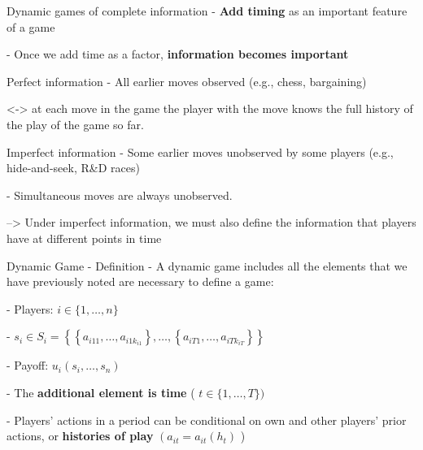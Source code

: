 \begin{titleboxchi}{Dynamic games of complete information}
    - \textbf{Add timing} as an important feature of a game
    
    - Once we add time as a factor, \textbf{information becomes important}
    
    \begin{definition}{Perfect information}
        - All earlier moves observed (e.g., chess, bargaining)
        
        <-> at each move in the game the player with the move knows the full history of the play of the game so far.
    \end{definition}
    
    \begin{definition}{Imperfect information}
        - Some earlier moves unobserved by some players (e.g., hide-and-seek, R\&D races)
        
        - Simultaneous moves are always unobserved.
        
        --> Under imperfect information, we must also define the information that players have at different points in
        time
    
    \end{definition}
    
    \begin{definition}{Dynamic Game - Definition}
        - A dynamic game includes all the elements that we have previously noted are necessary to define a game:
        
        - Players: $i \in\{1, \ldots, n\}$
        
        - $
        s_{i} \in S_{i}=\left\{\left\{a_{i 11}, \ldots, a_{i 1 k_{i 1}}\right\}, \ldots,\left\{a_{i T 1}, \ldots, a_
            {i T k_{i T}}\right\}\right\}$
        
        - Payoff: $u_{i}\left(s_{i}, \ldots, s_{n}\right)$
        
        - The \textbf{additional element is time} ( $t \in\{1, \ldots, T\})$
        
        
        - Players' actions in a period can be conditional on own and other players' prior actions,
        or \textbf{histories of play}
        $\left(a_{i t}=a_{i t}\left(h_{t}\right)\right.$ )
        

\end{definition}
\end{titleboxchi}
